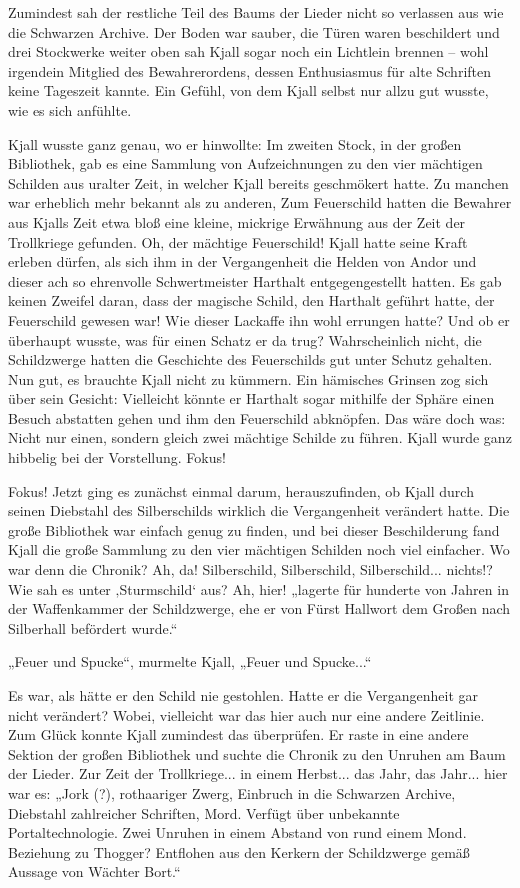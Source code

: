 Zumindest sah der restliche Teil des Baums der Lieder nicht so verlassen aus wie die Schwarzen Archive. Der Boden war sauber, die Türen waren beschildert und drei Stockwerke weiter oben sah Kjall sogar noch ein Lichtlein brennen – wohl irgendein Mitglied des Bewahrerordens, dessen Enthusiasmus für alte Schriften keine Tageszeit kannte. Ein Gefühl, von dem Kjall selbst nur allzu gut wusste, wie es sich anfühlte.

Kjall wusste ganz genau, wo er hinwollte: Im zweiten Stock, in der großen Bibliothek, gab es eine Sammlung von Aufzeichnungen zu den vier mächtigen Schilden aus uralter Zeit, in welcher Kjall bereits geschmökert hatte. Zu manchen war erheblich mehr bekannt als zu anderen, Zum Feuerschild hatten die Bewahrer aus Kjalls Zeit etwa bloß eine kleine, mickrige Erwähnung aus der Zeit der Trollkriege gefunden. Oh, der mächtige Feuerschild! Kjall hatte seine Kraft erleben dürfen, als sich ihm in der Vergangenheit die Helden von Andor und dieser ach so ehrenvolle Schwertmeister Harthalt entgegengestellt hatten. Es gab keinen Zweifel daran, dass der magische Schild, den Harthalt geführt hatte, der Feuerschild gewesen war! Wie dieser Lackaffe ihn wohl errungen hatte? Und ob er überhaupt wusste, was für einen Schatz er da trug? Wahrscheinlich nicht, die Schildzwerge hatten die Geschichte des Feuerschilds gut unter Schutz gehalten. Nun gut, es brauchte Kjall nicht zu kümmern. Ein hämisches Grinsen zog sich über sein Gesicht: Vielleicht könnte er Harthalt sogar mithilfe der Sphäre einen Besuch abstatten gehen und ihm den Feuerschild abknöpfen. Das wäre doch was: Nicht nur einen, sondern gleich zwei mächtige Schilde zu führen. Kjall wurde ganz hibbelig bei der Vorstellung. Fokus!

Fokus! Jetzt ging es zunächst einmal darum, herauszufinden, ob Kjall durch seinen Diebstahl des Silberschilds wirklich die Vergangenheit verändert hatte. Die große Bibliothek war einfach genug zu finden, und bei dieser Beschilderung fand Kjall die große Sammlung zu den vier mächtigen Schilden noch viel einfacher. Wo war denn die Chronik? Ah, da! Silberschild, Silberschild, Silberschild... nichts!? Wie sah es unter ‚Sturmschild‘ aus? Ah, hier! „lagerte für hunderte von Jahren in der Waffenkammer der Schildzwerge, ehe er von Fürst Hallwort dem Großen nach Silberhall befördert wurde.“

„Feuer und Spucke“, murmelte Kjall, „Feuer und Spucke...“

Es war, als hätte er den Schild nie gestohlen. Hatte er die Vergangenheit gar nicht verändert? Wobei, vielleicht war das hier auch nur eine andere Zeitlinie. Zum Glück konnte Kjall zumindest das überprüfen. Er raste in eine andere Sektion der großen Bibliothek und suchte die Chronik zu den Unruhen am Baum der Lieder. Zur Zeit der Trollkriege... in einem Herbst... das Jahr, das Jahr... hier war es: „Jork (?), rothaariger Zwerg, Einbruch in die Schwarzen Archive, Diebstahl zahlreicher Schriften, Mord. Verfügt über unbekannte Portaltechnologie. Zwei Unruhen in einem Abstand von rund einem Mond. Beziehung zu Thogger? Entflohen aus den Kerkern der Schildzwerge gemäß Aussage von Wächter Bort.“

